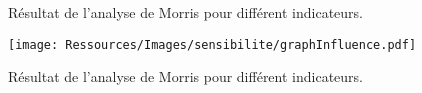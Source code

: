 \begin{figure}
    \begin{center}
    \end{center}
    \caption{Résultat de l’analyse de Morris pour différent indicateurs.
             \label{fig:morris_analysis_indicateurs}}
\end{figure}


\begin{landscape}
    \begin{figure}
      \begin{center}
          \texttt{[image: Ressources/Images/sensibilite/graphInfluence.pdf]}
      \end{center}
      \caption{Résultat de l’analyse de Morris pour différent indicateurs.
               \label{fig:graphe_influence}}
  \end{figure}
\end{landscape}

